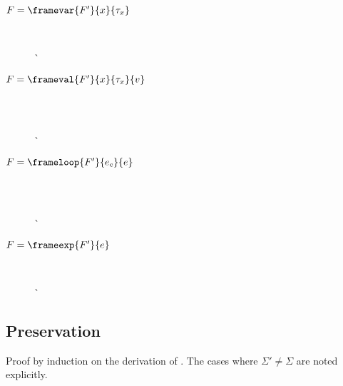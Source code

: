 \begin{enumerate}
  \begin{description}
  \item[$F=\framevar{F'}{x}{\tau_x}$] \ \\
    \begin{tabbing}
      \`  \\
    \end{tabbing}
  \item[$F=\frameval{F'}{x}{\tau_x}{v}$] \ \\
    \begin{tabbing}
     \\
      \`  \\
    \end{tabbing}
  \item[$F=\frameloop{F'}{e_c}{e}$] \ \\
    \begin{tabbing}
     \\
      \`  \\
    \end{tabbing}
  \item[$F=\frameexp{F'}{e}$] \ \\
    \begin{tabbing}
      \`  \\
    \end{tabbing}
  \end{description}

\end{enumerate} %

\subsection{Preservation}
\label{preservationproof}

Proof by induction on the derivation of . The cases where $\Sigma' \not= \Sigma$ are noted explicitly.

